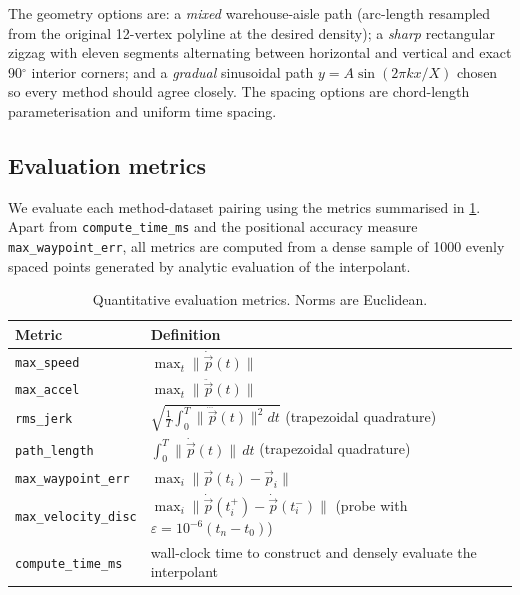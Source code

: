 The geometry options are: a \emph{mixed} warehouse-aisle path
(arc-length resampled from the original 12-vertex polyline at the
desired density); a \emph{sharp} rectangular zigzag with eleven
segments alternating between horizontal and vertical and exact 90$^{\circ}$
interior corners; and a \emph{gradual} sinusoidal path
$y = A \sin(2\pi k x / X)$ chosen so every method should agree
closely. The spacing options are chord-length parameterisation and
uniform time spacing.

\subsection{Evaluation metrics}
\label{sec:metrics}

We evaluate each method-dataset pairing using the metrics summarised
in \cref{tab:metrics}. Apart from \texttt{compute\_time\_ms} and the
positional accuracy measure \texttt{max\_waypoint\_err}, all metrics
are computed from a dense sample of 1000 evenly spaced points
generated by analytic evaluation of the interpolant.

\begin{table}[!t]
\centering
\caption{Quantitative evaluation metrics. Norms are Euclidean.}
\label{tab:metrics}
\begin{tabularx}{\linewidth}{lX}
\toprule
\textbf{Metric}     & \textbf{Definition} \\
\midrule
\texttt{max\_speed}    & $\max_t \| \dot{\vec{p}}(t) \|$ \\
\texttt{max\_accel}    & $\max_t \| \ddot{\vec{p}}(t) \|$ \\
\texttt{rms\_jerk}     & $\sqrt{\frac{1}{T} \int_0^T \| \dddot{\vec{p}}(t) \|^2 dt}$
                          (trapezoidal quadrature) \\
\texttt{path\_length}  & $\int_0^T \| \dot{\vec{p}}(t) \|\, dt$
                          (trapezoidal quadrature) \\
\texttt{max\_waypoint\_err} & $\max_i \|\vec{p}(t_i) - \vec{p}_i\|$ \\
\texttt{max\_velocity\_disc} & $\max_i \|\dot{\vec{p}}(t_i^+) - \dot{\vec{p}}(t_i^-)\|$
                                (probe with $\varepsilon = 10^{-6}(t_n - t_0)$) \\
\texttt{compute\_time\_ms}   & wall-clock time to construct and densely
                                evaluate the interpolant \\
\bottomrule
\end{tabularx}
\end{table}

